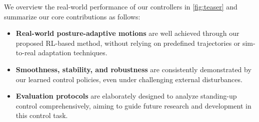 We overview the real-world performance of our controllers in \cref{fig:teaser} and summarize our core contributions as follows:
\begin{itemize}[leftmargin=4mm]
\vspace{-0.02in}
    \item \textbf{Real-world posture-adaptive motions} are well achieved through our proposed RL-based method, without relying on predefined trajectories or sim-to-real adaptation techniques.
    \item \textbf{Smoothness, stability, and robustness}  are consistently demonstrated by our learned control policies, even under challenging external disturbances.
    \item \textbf{Evaluation protocols} are elaborately designed to analyze standing-up control comprehensively, aiming to guide future research and development in this control task.
\vspace{-0.02in}
\end{itemize}